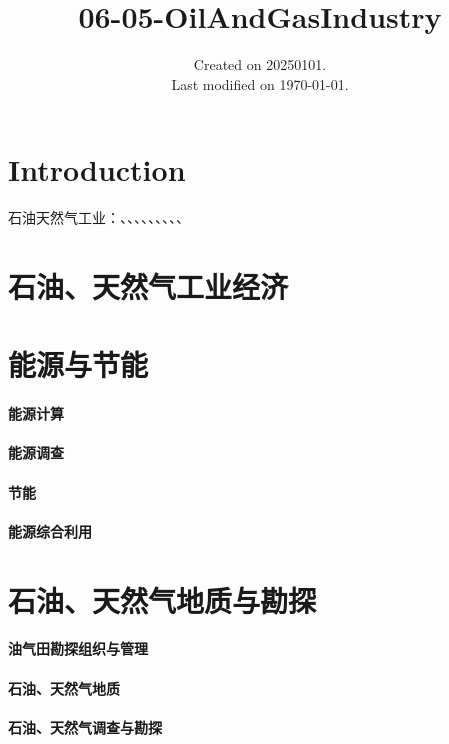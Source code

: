 \documentclass[UTF8]{../../ApplicationUniverse}
\begin{document}
\title{06-05-OilAndGasIndustry}
\date{Created on 20250101.\\   Last modified on \today.}
\maketitle
\tableofcontents


\chapter{Introduction}

石油天然气工业：、、、、、、、、、




\chapter{石油、天然气工业经济}



\chapter{能源与节能}
\subsubsection{能源计算}
\subsubsection{能源调查}
\subsubsection{节能}
\subsubsection{能源综合利用}



\chapter{石油、天然气地质与勘探}
\subsubsection{油气田勘探组织与管理}
\subsubsection{石油、天然气地质}
\subsubsection{石油、天然气调查与勘探}
\end{document}
